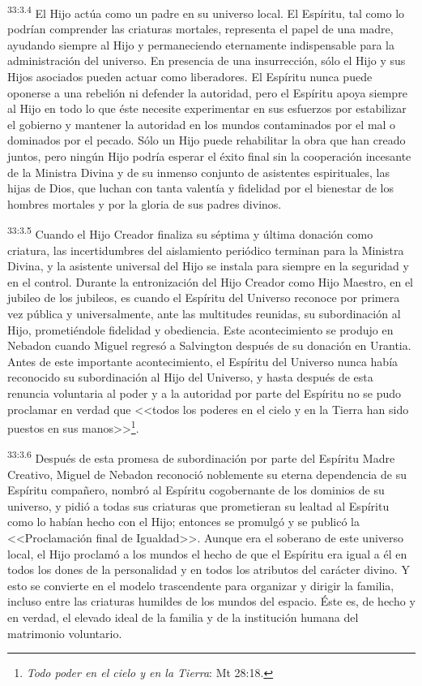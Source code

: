 \par
\textsuperscript{33:3.4} El Hijo actúa como un padre en su universo local. El Espíritu, tal como lo podrían comprender las criaturas mortales, representa el papel de una madre, ayudando siempre al Hijo y permaneciendo eternamente indispensable para la administración del universo. En presencia de una insurrección, sólo el Hijo y sus Hijos asociados pueden actuar como liberadores. El Espíritu nunca puede oponerse a una rebelión ni defender la autoridad, pero el Espíritu apoya siempre al Hijo en todo lo que éste necesite experimentar en sus esfuerzos por estabilizar el gobierno y mantener la autoridad en los mundos contaminados por el mal o dominados por el pecado. Sólo un Hijo puede rehabilitar la obra que han creado juntos, pero ningún Hijo podría esperar el éxito final sin la cooperación incesante de la Ministra Divina y de su inmenso conjunto de asistentes espirituales, las hijas de Dios, que luchan con tanta valentía y fidelidad por el bienestar de los hombres mortales y por la gloria de sus padres divinos.

\par
\textsuperscript{33:3.5} Cuando el Hijo Creador finaliza su séptima y última donación como criatura, las incertidumbres del aislamiento periódico terminan para la Ministra Divina, y la asistente universal del Hijo se instala para siempre en la seguridad y en el control. Durante la entronización del Hijo Creador como Hijo Maestro, en el jubileo de los jubileos, es cuando el Espíritu del Universo reconoce por primera vez pública y universalmente, ante las multitudes reunidas, su subordinación al Hijo, prometiéndole fidelidad y obediencia. Este acontecimiento se produjo en Nebadon cuando Miguel regresó a Salvington después de su donación en Urantia. Antes de este importante acontecimiento, el Espíritu del Universo nunca había reconocido su subordinación al Hijo del Universo, y hasta después de esta renuncia voluntaria al poder y a la autoridad por parte del Espíritu no se pudo proclamar en verdad que <<todos los poderes en el cielo y en la Tierra han sido puestos en sus manos>>\footnote{\textit{Todo poder en el cielo y en la Tierra}: Mt 28:18.}.

\par
\textsuperscript{33:3.6} Después de esta promesa de subordinación por parte del Espíritu Madre Creativo, Miguel de Nebadon reconoció noblemente su eterna dependencia de su Espíritu compañero, nombró al Espíritu cogobernante de los dominios de su universo, y pidió a todas sus criaturas que prometieran su lealtad al Espíritu como lo habían hecho con el Hijo; entonces se promulgó y se publicó la <<Proclamación final de Igualdad>>. Aunque era el soberano de este universo local, el Hijo proclamó a los mundos el hecho de que el Espíritu era igual a él en todos los dones de la personalidad y en todos los atributos del carácter divino. Y esto se convierte en el modelo trascendente para organizar y dirigir la familia, incluso entre las criaturas humildes de los mundos del espacio. Éste es, de hecho y en verdad, el elevado ideal de la familia y de la institución humana del matrimonio voluntario.

